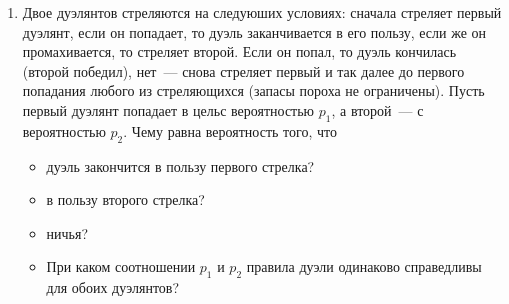 \documentclass{article}
\begin{document}
\begin{enumerate}
    $P(A_1) = P(B_2) \cdot P(B_1) \cdot (1 - P(B_2)) + P(B_2) \cdot P(B_1) \cdot P(B_2) + (1 - P(B_2)) \cdot P(B_1) \cdot P(B_2) = P(B_1) \cdot P(B_2) + (1 - P(B_2)) \cdot P(B_1) \cdot P(B_2)$.

    $P(A_2) = P(B_1) \cdot P(B_2) \cdot (1 - P(B_1)) + P(B_1) \cdot P(B_2) \cdot P(B_1) + (1 - P(B_1)) \cdot P(B_2) \cdot P(B_1) = P(B_1) \cdot P(B_2) + (1 - P(B_1)) \cdot P(B_2) \cdot P(B_1)$.

    $P(A_1) - P(A_2) = P(B_1) - P(B_2) > 0$ \rightarrow $A_1$ выгоднее.

    Вторая подзадача:

    $P(A_1) = P(B_2) \cdot P(B_1) \cdot (1 - P(B_2)) + P(B_2) \cdot P(B_1) \cdot P(B_2) + (1 - P(B_2)) \cdot P(B_1) \cdot P(B_2) + P(B_2) \cdot (1 - P(B_1)) \cdot P(B_2)$.

    $P(A_2) = P(B_1) \cdot P(B_2) \cdot (1 - P(B_1)) + P(B_1) \cdot P(B_2) \cdot P(B_1) + (1 - P(B_1)) \cdot P(B_2) \cdot P(B_1) + P(B_1) \cdot (1 - P(B_2)) \cdot P(B_1)$.

    $P(A_1) - P(A_2) = -2 \cdot P(B_1) \cdot P(B_2) + P(B_2) - P(B_1) + 2 \cdot P(B_2) \cdot P(B_1) = (P(B_2) - P(B_1)) \cdot (P(B_1) + P(B_2) - 2 P(B_1) \cdot P(B_2)) < 0$ \rightarrow $A_2$ выгоднее.

    \answer{}

    \begin{itemize}
        \item $A_1$ выгоднее
        \item $A_2$ выгоднее.
    \end{itemize}


    \item Двое дуэлянтов стреляются на следуюших условиях: сначала стреляет первый дуэлянт, если он попадает, то дуэль заканчивается в его пользу, если же он промахивается, то стреляет второй. Если он попал, то дуэль кончилась (второй победил), нет~--- снова стреляет первый и так далее до первого попадания любого из стреляющихся (запасы пороха не ограничены). Пусть первый дуэлянт попадает в цельс  вероятностью $p_1$, а второй~--- с вероятностью $p_2$. Чему равна вероятность того, что 
    \begin{itemize}
        \item дуэль закончится в пользу первого стрелка?
        \item в пользу второго стрелка?
        \item ничья?
        \item При каком соотношении $p_1$ и $p_2$ правила дуэли одинаково справедливы для обоих дуэлянтов?
    \end{itemize}


\end{enumerate}
\end{document}

